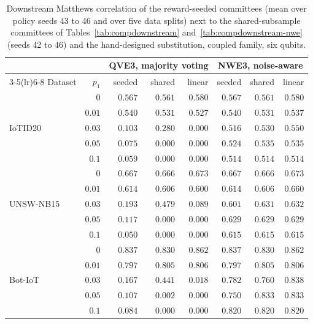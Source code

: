 \begin{table}[t]
\centering
\caption{Downstream Matthews correlation of the reward-seeded committees (mean over
policy seeds 43 to 46 and over five data splits) next to the shared-subsample committees
of Tables~\ref{tab:compdownstream} and~\ref{tab:compdownstream-nwe} (seeds 42 to 46)
and the hand-designed substitution, coupled family, six qubits.}
\label{tab:s3downstream}
\footnotesize
\setlength{\tabcolsep}{3pt}
\begin{tabular}{@{}lrrrrrrr@{}}
\toprule
& & \multicolumn{3}{c}{QVE3, majority voting} & \multicolumn{3}{c}{NWE3, noise-aware} \\
\cmidrule(lr){3-5}\cmidrule(lr){6-8}
Dataset & $p_1$ & seeded & shared & linear & seeded & shared & linear \\
\midrule
\multirow{5}{*}{IoTID20}
 & $0$ & $0.567$ & $0.561$ & $0.580$ & $0.567$ & $0.561$ & $0.580$ \\
 & $0.01$ & $0.540$ & $0.531$ & $0.527$ & $0.540$ & $0.531$ & $0.537$ \\
 & $0.03$ & $0.103$ & $0.280$ & $0.000$ & $0.516$ & $0.530$ & $0.550$ \\
 & $0.05$ & $0.075$ & $0.000$ & $0.000$ & $0.524$ & $0.535$ & $0.535$ \\
 & $0.1$ & $0.059$ & $0.000$ & $0.000$ & $0.514$ & $0.514$ & $0.514$ \\
\midrule
\multirow{5}{*}{UNSW-NB15}
 & $0$ & $0.667$ & $0.666$ & $0.673$ & $0.667$ & $0.666$ & $0.673$ \\
 & $0.01$ & $0.614$ & $0.606$ & $0.600$ & $0.614$ & $0.606$ & $0.660$ \\
 & $0.03$ & $0.193$ & $0.479$ & $0.089$ & $0.601$ & $0.631$ & $0.632$ \\
 & $0.05$ & $0.117$ & $0.000$ & $0.000$ & $0.629$ & $0.629$ & $0.629$ \\
 & $0.1$ & $0.050$ & $0.000$ & $0.000$ & $0.615$ & $0.615$ & $0.615$ \\
\midrule
\multirow{5}{*}{Bot-IoT}
 & $0$ & $0.837$ & $0.830$ & $0.862$ & $0.837$ & $0.830$ & $0.862$ \\
 & $0.01$ & $0.797$ & $0.805$ & $0.806$ & $0.797$ & $0.805$ & $0.806$ \\
 & $0.03$ & $0.167$ & $0.441$ & $0.018$ & $0.782$ & $0.760$ & $0.838$ \\
 & $0.05$ & $0.107$ & $0.002$ & $0.000$ & $0.750$ & $0.833$ & $0.833$ \\
 & $0.1$ & $0.084$ & $0.000$ & $0.000$ & $0.820$ & $0.820$ & $0.820$ \\
\bottomrule
\end{tabular}
\end{table}
